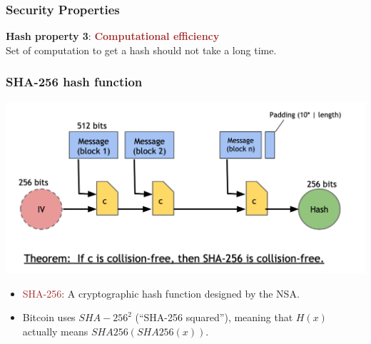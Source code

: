 \documentclass{beamer}
\begin{document}
\begin{frame}
  \frametitle{Security Properties}
  
  \begin{block}{\textbf{Hash property 3}:}
  \textcolor{brown}{\textbf{Computational efficiency}} \\
Set of computation to get a hash should not take a long time.
 	\end{block}
\end{frame}
\begin{frame}
  \frametitle{SHA-256 hash function}
  
	\includegraphics[scale=0.5]{sha}
 
	\begin{itemize}
		\item \textcolor{brown}{SHA-256}: A cryptographic hash function designed by the NSA.
		\item Bitcoin uses $SHA-256^2$ (``SHA-256 squared''), meaning that $H(x)$ actually means $SHA256(SHA256(x))$.

	\end{itemize}

\end{frame}
\end{document}
